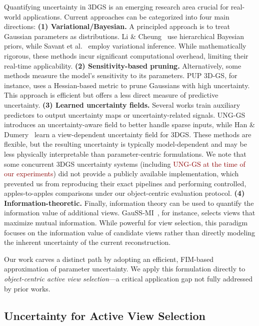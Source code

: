 \documentclass{egpubl}
\newcommand{\rev}[1]{\textcolor{darkred}{#1}}
\begin{document}
Quantifying uncertainty in 3DGS is an emerging research area crucial for real-world applications. Current approaches can be categorized into four main directions:
\textbf{(1) Variational/Bayesian.}
A principled approach is to treat Gaussian parameters as distributions. Li \& Cheung~\cite{NEURIPS2024_a076d0d1} use hierarchical Bayesian priors, while Savant et al.~\cite{wilsonModelingUncertainty3D2024} employ variational inference. While mathematically rigorous, these methods incur significant computational overhead, limiting their real-time applicability.
\textbf{(2) Sensitivity-based pruning.}
Alternatively, some methods measure the model's sensitivity to its parameters. PUP 3D-GS, for instance, uses a Hessian-based metric to prune Gaussians with high uncertainty. This approach is efficient but offers a less direct measure of predictive uncertainty.
\textbf{(3) Learned uncertainty fields.}
Several works train auxiliary predictors to output uncertainty maps or uncertainty-related signals.
UNG-GS~\cite{tanUncertaintyAwareNormalGuidedGaussian2025} introduces an uncertainty-aware field to better handle sparse inputs, while Han \& Dumery~\cite{hanViewDependentUncertaintyEstimation2025} learn a view-dependent uncertainty field for 3DGS.
These methods are flexible, but the resulting uncertainty is typically model-dependent and may be less physically interpretable than parameter-centric formulations.
We note that some concurrent 3DGS uncertainty systems (including \rev{UNG-GS at the time of our experiments}) did not provide a publicly available implementation, which prevented us from reproducing their exact pipelines and performing controlled, apples-to-apples comparisons under our object-centric evaluation protocol.
\textbf{(4) Information-theoretic.}
Finally, information theory can be used to quantify the information value of additional views. GauSS-MI~\cite{xieGauSSMIGaussianSplatting2025}, for instance, selects views that maximize mutual information. While powerful for view selection, this paradigm focuses on the information value of candidate views rather than directly modeling the inherent uncertainty of the current reconstruction.

Our work carves a distinct path by adopting an efficient, FIM-based approximation of parameter uncertainty. We apply this formulation directly to \emph{object-centric active view selection}---a critical application gap not fully addressed by prior works.

\subsection{Uncertainty for Active View Selection}
\label{sec:related-nbv}
\end{document}
